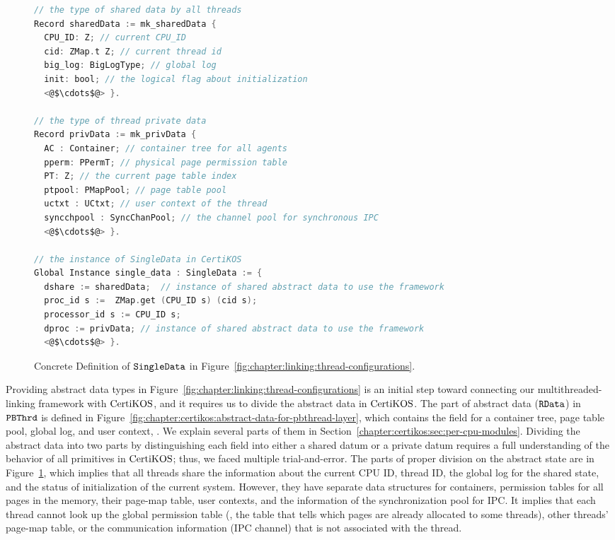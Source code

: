 \begin{figure}
\begin{lstlisting}[language=C]
// the type of shared data by all threads
Record sharedData := mk_sharedData {
  CPU_ID: Z; // current CPU_ID 
  cid: ZMap.t Z; // current thread id
  big_log: BigLogType; // global log
  init: bool; // the logical flag about initialization
  <@$\cdots$@> }.
  
// the type of thread private data
Record privData := mk_privData {
  AC : Container; // container tree for all agents
  pperm: PPermT; // physical page permission table 
  PT: Z; // the current page table index
  ptpool: PMapPool; // page table pool
  uctxt : UCtxt; // user context of the thread
  syncchpool : SyncChanPool; // the channel pool for synchronous IPC
  <@$\cdots$@> }.

// the instance of SingleData in CertiKOS
Global Instance single_data : SingleData := {
  dshare := sharedData;  // instance of shared abstract data to use the framework
  proc_id s :=  ZMap.get (CPU_ID s) (cid s);
  processor_id s := CPU_ID s;
  dproc := privData; // instance of shared abstract data to use the framework
  <@$\cdots$@> }.
\end{lstlisting}
\caption{Concrete Definition of ${\mathrm{\texttt{SingleData}}}$ in Figure~\ref{fig:chapter:linking:thread-configurations}.}

\label{fig:chapter:certikos:single-data-of-multithreaded-linking-certikos}
\end{figure}

Providing abstract data types in  Figure~\ref{fig:chapter:linking:thread-configurations} is an initial step 
toward connecting our multithreaded-linking framework with $\mathrm{CertiKOS}$,
and it requires us to divide the abstract data in $\mathrm{CertiKOS}$.
The part of abstract data (${\mathrm{\texttt{RData}}}$) in ${{\mathrm{\texttt{PBThrd}}}}$
is defined in Figure~\ref{fig:chapter:certikos:abstract-data-for-pbthread-layer}, 
which contains the field for a container tree, page table pool, global log, and user context, \etc.
We explain several parts of them in Section~\ref{chapter:certikos:sec:per-cpu-modules}. 
Dividing the abstract data into two parts by distinguishing 
each field into either a shared datum or a private datum 
requires a full understanding of the behavior of all primitives in $\mathrm{CertiKOS}$;
thus, we faced multiple trial-and-error.
The parts of proper division on the abstract state are in Figure~\ref{fig:chapter:certikos:single-data-of-multithreaded-linking-certikos},
which implies that 
all threads share the information about the current CPU ID, thread ID, the global log for the shared state,
and the status of initialization of the current system. 
However, they have separate data structures 
 for containers, permission tables for all pages in the memory, 
 their page-map table, user contexts, and the information of the synchronization pool for IPC.
 It implies that 
 each thread cannot look up the global permission table (\ie, the table that tells which pages are already allocated to some threads),
 other threads' page-map table, or the communication information (IPC channel) that is not associated with the thread.

